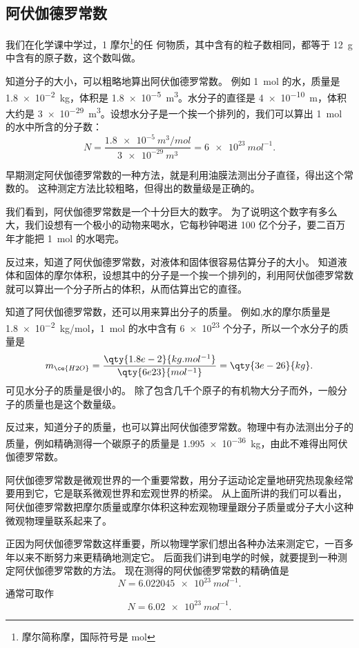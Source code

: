 \subsection{阿伏伽德罗常数}

我们在化学课中学过，1 摩尔\footnote{摩尔简称摩，国际符号是 \unit{mol}}的任
何物质，其中含有的粒子数相同，都等于 \qty{12}{g}  中含有的原子数，这个数叫做。

知道分子的大小，可以粗略地算出阿伏伽德罗常数。
例如 \qty{1}{mol} 的水，质量是 \qty{1.8e-2}{kg}，体积是 \qty{1.8e-5}{m^3}。水分子的直径是 \qty{4e-10}{m}，体积大约是 \qty{3e-29}{m^3}。设想水分子是一个挨一个排列的，我们可以算出 \qty{1}{mol} 的水中所含的分子数：
\[N=\frac{\qty{1.8e-5}{m^3/mol}}{\qty{3e-29}{m^3}}=\qty{6e23}{mol^{-1}}.\]

早期测定阿伏伽德罗常数的一种方法，就是利用油膜法测出分子直径，得出这个常数的。
这种测定方法比较粗略，但得出的数量级是正确的。

我们看到，阿伏伽德罗常数是一个十分巨大的数字。
为了说明这个数字有多么大，我们设想有一个极小的动物来喝水，它每秒钟喝进 100 亿个分子，要二百万年才能把 \qty{1}{mol} 的水喝完。

反过来，知道了阿伏伽德罗常数，对液体和固体很容易估算分子的大小。
知道液体和固体的摩尔体积，设想其中的分子是一个挨一个排列的，利用阿伏伽德罗常数就可以算出一个分子所占的体积，从而估算出它的直径。

知道了阿伏伽德罗常数，还可以用来算出分子的质量。
例如,水的摩尔质量是 \qty{1.8e-2}{kg/mol}，\qty{1}{mol} 的水中含有 \num{6e23} 个分子，所以一个水分子的质量是
\[m_{\ce{H2O}}=\frac{\qty{1.8e-2}{kg.mol^{-1}}}{\qty{6e23}{mol^{-1}}}=\qty{3e-26}{kg}.\]
可见水分子的质量是很小的。
除了包含几千个原子的有机物大分子而外，一般分子的质量也是这个数量级。

反过来，知道分子的质量，也可以算出阿伏伽德罗常数。物理中有办法测出分子的质量，例如精确测得一个碳原子的质量是 \qty{1.995e-36}{kg}，由此不难得出阿伏伽德罗常数。

阿伏伽德罗常数是微观世界的一个重要常数，用分子运动论定量地研究热现象经常要用到它，它是联系微观世界和宏观世界的桥梁。
从上面所讲的我们可以看出，阿伏伽德罗常数把摩尔质量或摩尔体积这种宏观物理量跟分子质量或分子大小这种微观物理量联系起来了。

正因为阿伏伽德罗常数这样重要，所以物理学家们想出各种办法来测定它，一百多年以来不断努力来更精确地测定它。
后面我们讲到电学的时候，就要提到一种测定阿伏伽德罗常数的方法。
现在测得的阿伏伽德罗常数的精确值是
\[N=\qty{6.022045e23}{mol^{-1}}.\]
通常可取作
\[N=\qty{6.02e23}{mol^{-1}}.\]

